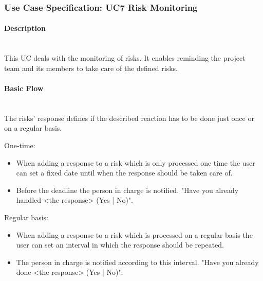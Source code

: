 
\newpage
\subsubsection{Use Case Specification: \ac{UC}7 Risk Monitoring}
\label{sec:domainBbh}

\paragraph*{Description}\mbox{}\\
This \ac{UC} deals with the monitoring of risks. It enables reminding the project team and its members to take care of the defined risks.

\paragraph*{Basic Flow} \mbox{}\\
\noindent
The risks' response defines if the described reaction has to be done just once or on a regular basis. 

\noindent
One-time:
\begin{itemize}
	\vspace{-3mm}
	\setlength\itemsep{-1em}	
	\item When adding a response to a risk which is only processed one time the user can set a fixed date until when the response should be taken care of.
	\item Before the deadline the person in charge is notified. "Have you already handled <the response> (Yes | No)".
\end{itemize}

\noindent
Regular basis:
\begin{itemize}
	\vspace{-3mm}
	\setlength\itemsep{-1em}
	
	\item When adding a response to a risk which is processed on a regular basis the user can set an interval in which the response should be repeated.
	\item The person in charge is notified according to this interval. "Have you already done <the response> (Yes | No)".
\end{itemize}

